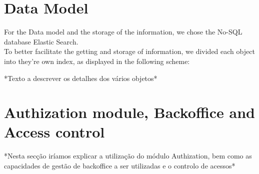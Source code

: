 \documentclass[a4paper,twoside,10pt]{report}
\begin{document}
\section{Data Model}
For the Data model and the storage of the information, we chose the No-SQL database Elastic Search.
\\ \newline
To better facilitate the getting and storage of information, we divided each object into they're own index, as displayed in the following scheme:
\begin{center}
\end{center}
*Texto a descrever os detalhes dos vários objetos*

\section{Authization module, Backoffice and Access control}
*Nesta secção iríamos explicar a utilização do módulo Authization, bem como as capacidades de gestão de backoffice a ser utilizadas e o controlo de acessos*
\end{document}
